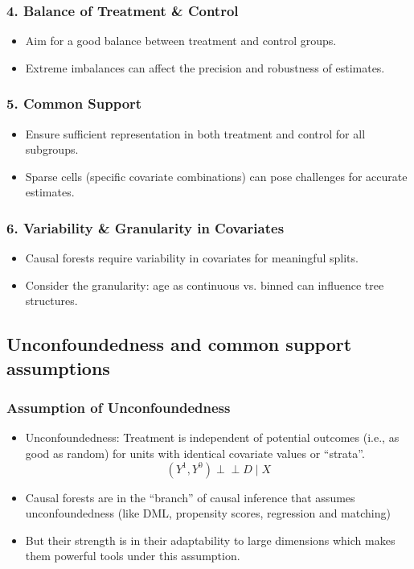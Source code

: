 \documentclass{beamer}
\begin{document}
\begin{frame}
\frametitle{4. Balance of Treatment \& Control}
\begin{itemize}
    \item Aim for a good balance between treatment and control groups.
    \item Extreme imbalances can affect the precision and robustness of estimates.
\end{itemize}
\end{frame}

\begin{frame}
\frametitle{5. Common Support}
\begin{itemize}
    \item Ensure sufficient representation in both treatment and control for all subgroups.
    \item Sparse cells (specific covariate combinations) can pose challenges for accurate estimates.
\end{itemize}
\end{frame}

\begin{frame}
\frametitle{6. Variability \& Granularity in Covariates}
\begin{itemize}
    \item Causal forests require variability in covariates for meaningful splits.
    \item Consider the granularity: age as continuous vs. binned can influence tree structures.
\end{itemize}
\end{frame}

\subsection{Unconfoundedness and common support assumptions}

\begin{frame}
\frametitle{Assumption of Unconfoundedness}
\begin{itemize}
    \item Unconfoundedness: Treatment is independent of potential outcomes (i.e., as good as random) for units with identical covariate values or ``strata''.$$(Y^1, Y^0) \perp\!\!\!\perp D \mid X$$

    \item Causal forests are in the ``branch'' of causal inference that assumes unconfoundedness (like DML, propensity scores, regression and matching)
    \item But their strength is in their adaptability to large dimensions which makes them powerful tools under this assumption.

\end{itemize}
\end{frame}
\end{document}
